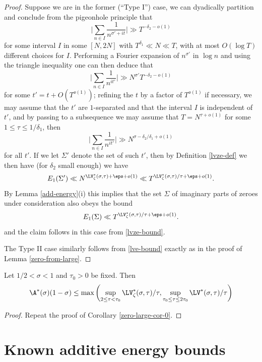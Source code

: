 \begin{proof}
Suppose we are in the former (``Type I'') case, we can dyadically partition and conclude from the pigeonhole principle that
$$ \bigg| \sum_{n \in I} \frac{1}{n^{\sigma'+it}} \bigg| \gg T^{-\delta_2-o(1)}$$
for some interval $I$ in some $[N,2N]$ with $T^{\delta_1} \ll N \ll T$, with at most $O(\log T)$ different choices for $I$.  Performing a Fourier expansion of $n^{\sigma'}$ in $\log n$ and using the triangle inequality one can then deduce that
$$ \bigg| \sum_{n \in I} \frac{1}{n^{it'}} \bigg| \gg N^{\sigma'} T^{-\delta_2-o(1)}$$
for some $t' = t + O(T^{o(1)})$; refining the $t$ by a factor of $T^{o(1)}$ if necessary, we may assume that the $t'$ are $1$-separated and that the interval $I$ is independent of $t'$, and by passing to a subsequence we may assume that $T = N^{\tau+o(1)}$ for some $1 \leq \tau \leq 1/\delta_1$, then
$$ \bigg| \sum_{n \in I} \frac{1}{n^{it'}} \bigg| \gg N^{\sigma-\delta_2/\delta_1+o(1)}$$
for all $t'$.  If we let $\Sigma'$ denote the set of such $t'$, then by Definition \ref{lvze-def} we then have (for $\delta_2$ small enough) we have
$$ E_1(\Sigma') \ll N^{\LV^*_\zeta(\sigma,\tau) + \eps + o(1)} \ll T^{\LV^*_\zeta(\sigma,\tau)/\tau + \eps + o(1)}.$$
By Lemma \ref{add-energy}(i) this implies that the set $\Sigma$ of imaginary parts of zeroes under consideration also obeys the bound
$$ E_1(\Sigma) \ll T^{\LV^*_\zeta(\sigma,\tau)/\tau + \eps + o(1)}.$$
and the claim follows in this case from \eqref{lvze-bound}.

The Type II case similarly follows from \eqref{lve-bound} exactly as in the proof of Lemma \ref{zero-from-large}.
\end{proof}


\begin{corollary}\label{zeroe-large-cor-0} Let $1/2 < \sigma < 1$ and $\tau_0 > 0$ be fixed.  Then
$$ \A^*(\sigma)(1-\sigma) \leq \max \left(\sup_{2 \leq \tau < \tau_0} \LV^*_\zeta(\sigma,\tau)/\tau, \sup_{\tau_0 \leq \tau \leq 2\tau_0} \LV^*(\sigma,\tau)/\tau\right)$$
\end{corollary}


\begin{proof}  Repeat the proof of Corollary \ref{zero-large-cor-0}.
\end{proof}

\section{Known additive energy bounds}

